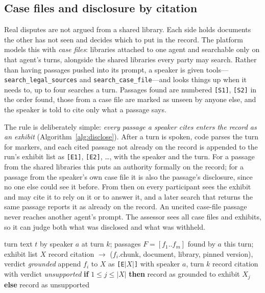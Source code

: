 \documentclass[acmsmall,screen,review]{acmart}
\newcommand{\code}[1]{\texttt{\small #1}}
\newcommand{\mk}[1]{\texttt{[#1]}}
\begin{document}
\subsection{Case files and disclosure by citation}
\label{sec:exhibits}

Real disputes are not argued from a shared library. Each side holds documents the other has not seen and decides which to put in the record. The platform models this with \emph{case files}: libraries attached to one agent and searchable only on that agent's turns, alongside the shared libraries every party may search. Rather than having passages pushed into its prompt, a speaker is given tools---\code{search\_legal\_sources} and \code{search\_case\_file}---and looks things up when it needs to, up to four searches a turn. Passages found are numbered \mk{S1}, \mk{S2} in the order found, those from a case file are marked as unseen by anyone else, and the speaker is told to cite only what a passage says.

The rule is deliberately simple: \emph{every passage a speaker cites enters the record as an exhibit} (Algorithm~\ref{alg:disclose}). After a turn is spoken, code parses the turn for markers, and each cited passage not already on the record is appended to the run's exhibit list as \mk{E1}, \mk{E2}, \ldots, with the speaker and the turn. For a passage from the shared libraries this puts an authority formally on the record; for a passage from the speaker's own case file it is also the passage's disclosure, since no one else could see it before. From then on every participant sees the exhibit and may cite it to rely on it or to answer it, and a later search that returns the same passage reports it as already on the record. An uncited case-file passage never reaches another agent's prompt. The assessor sees all case files and exhibits, so it can judge both what was disclosed and what was withheld.

\begin{algorithm}[t]
\caption{Recording a turn's citations and disclosures (simplified).}
\label{alg:disclose}
\small
\begin{algorithmic}[1]
\Require turn text $t$ by speaker $a$ at turn $k$; passages $F = [f_1..f_m]$ found by $a$ this turn; exhibit list $X$
\For{each marker \mk{S$i$} in $t$}
   
    \State record citation $\to$ ($f_i$.chunk, document, library, pinned version), verdict \emph{grounded}
     
      \State append $f_i$ to $X$ as \mk{E$|X|$} with speaker $a$, turn $k$ 
    \EndIf
  \Else
    \State record citation with verdict \emph{unsupported} 
  \EndIf
\EndFor
\For{each marker \mk{E$j$} in $t$}
  \State \textbf{if} $1 \le j \le |X|$ \textbf{then} record as grounded to exhibit $X_j$ \textbf{else} record as unsupported
\EndFor
\end{algorithmic}
\end{algorithm}
\end{document}
